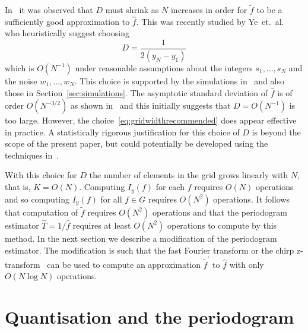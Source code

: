 \documentclass[10pt,twocolumn,twoside]{IEEEtran}
\begin{document}
In~\cite{McKilliam2007} it was observed that $D$ must shrink as $N$ increases in order for $\widetilde{f}$ to be a sufficiently good approximation to $\hat{f}$.  This was recently studied by Ye~et.~al.~\cite{Haohuan2013435,6492742} who heuristically suggest choosing
\begin{equation}\label{eq:gridwidthrecommended}
D = \frac{1}{2(y_N - y_1)}
\end{equation}
which is $O(N^{-1})$ under reasonable assumptions about the integers $s_1,\dots,s_N$ and the noise $w_1,\dots,w_N$.  This choice is supported by the simulations in~\cite{Haohuan2013435,6492742} and also those in Section~\ref{sec:simulations}.  The asymptotic standard deviation of $\hat{f}$ is of order $O(N^{-3/2})$ as shown in~\cite{Quinn20013asilomar_period_est} and this initially suggests that $D = O(N^{-1})$ is too large.  However, the choice~\eqref{eq:gridwidthrecommended} does appear effective in practice.  A statistically rigorous justification for this choice of $D$ is beyond the scope of the present paper, but could potentially be developed using the techniques in~\cite{Quinn2008maximizing_the_periodogram}.

With this choice for $D$ the number of elements in the grid grows linearly with $N$, that is, $K = O(N)$.  Computing $I_y(f)$ for each $f$ requires $O(N)$ operations and so computing $I_y(f)$ for all $f \in G$ requires $O(N^2)$ operations.  It follows that computation of $\widetilde{f}$ requires $O(N^2)$ operations and that the periodogram estimator $\hat{T} = 1/\hat{f}$ requires at least $O(N^2)$ operations to compute by this method.  %
In the next section we describe a modification of the periodogram estimator.  The modification is such that the fast Fourier transform or the chirp z-transform~\cite{Rabiner1969} can be used to compute an approximation $\widetilde{f}^\prime$ to $\hat{f}$ with only $O(N\log N)$ operations.

\section{Quantisation and the periodogram}\label{sec:quant-peri} 
\end{document}
